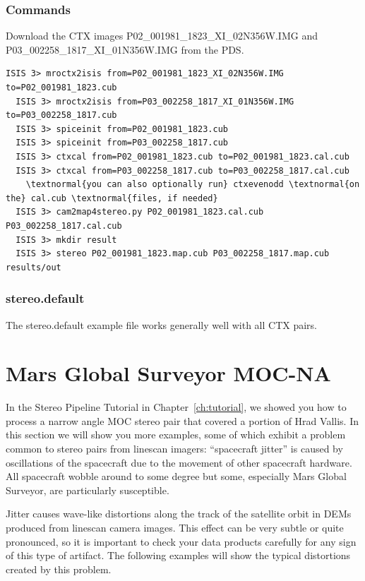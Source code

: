 \subsubsection*{Commands}

Download the \ac{CTX} images P02\_001981\_1823\_XI\_02N356W.IMG and
P03\_002258\_1817\_XI\_01N356W.IMG from the \ac{PDS}.
\begin{Verbatim}[commandchars=\\\{\}]
  ISIS 3> mroctx2isis from=P02_001981_1823_XI_02N356W.IMG to=P02_001981_1823.cub
  ISIS 3> mroctx2isis from=P03_002258_1817_XI_01N356W.IMG to=P03_002258_1817.cub
  ISIS 3> spiceinit from=P02_001981_1823.cub
  ISIS 3> spiceinit from=P03_002258_1817.cub
  ISIS 3> ctxcal from=P02_001981_1823.cub to=P02_001981_1823.cal.cub
  ISIS 3> ctxcal from=P03_002258_1817.cub to=P03_002258_1817.cal.cub
    \textnormal{you can also optionally run} ctxevenodd \textnormal{on the} cal.cub \textnormal{files, if needed}
  ISIS 3> cam2map4stereo.py P02_001981_1823.cal.cub P03_002258_1817.cal.cub
  ISIS 3> mkdir result
  ISIS 3> stereo P02_001981_1823.map.cub P03_002258_1817.map.cub results/out
\end{Verbatim}

\subsubsection*{stereo.default}

The stereo.default example file works generally well with all CTX pairs.

\clearpage
\section{Mars Global Surveyor MOC-NA}

In the Stereo Pipeline Tutorial in Chapter~\ref{ch:tutorial}, we
showed you how to process a narrow angle \ac{MOC} stereo pair that
covered a portion of Hrad Vallis. In this section we will show you
more examples, some of which exhibit a problem common to stereo
pairs from linescan imagers: ``spacecraft jitter'' is caused by
oscillations of the spacecraft due to the movement of other spacecraft
hardware.  All spacecraft wobble around to some degree but some,
especially Mars Global Surveyor, are particularly susceptible.

Jitter causes wave-like distortions along the track of the satellite
orbit in \acp{DEM} produced from linescan camera images.  This effect can
be very subtle or quite pronounced, so it is important to check your
data products carefully for any sign of this type of artifact. The
following examples will show the typical distortions created by this
problem.

